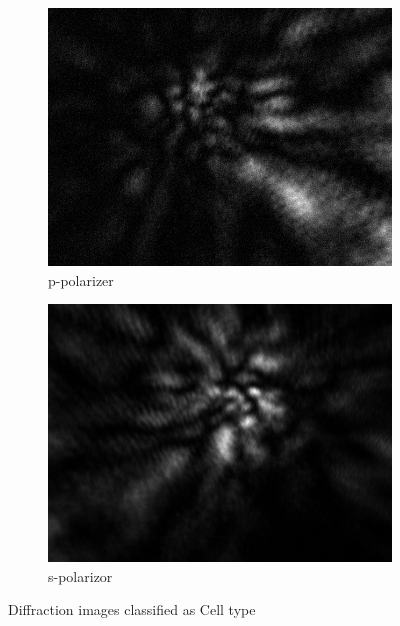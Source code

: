 \begin{figure}[!h]
\begin{subfigure}[b]{0.2\textwidth}
    \includegraphics[width=\textwidth]{diffraction_image/2015040117594700185-1}
    \caption{p-polarizer}
  \end{subfigure}
  \begin{subfigure}[b]{0.2\textwidth}
    \includegraphics[width=\textwidth]{diffraction_image/2015040117594700185-2}
    \caption{s-polarizor}
  \end{subfigure}
  \caption{Diffraction images classified as Cell type}
\end{figure}
